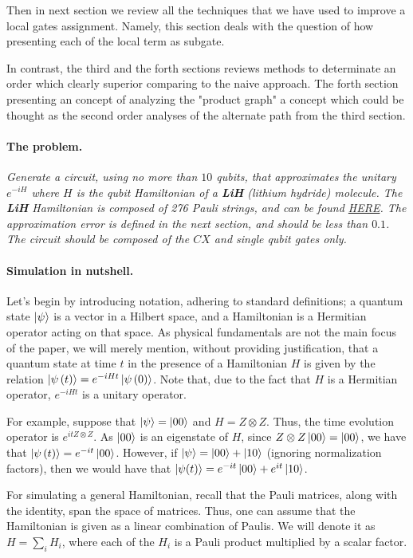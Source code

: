 \documentclass{article}
\begin{document}
\begin{multicols}{2}
Then in next section we review all the techniques that we have used to improve a  local gates assignment. Namely, this section deals with the question of how presenting each of the local term as subgate. 

  In contrast, the third and the forth sections reviews methods to determinate an  order which clearly superior comparing to the naive approach. The forth section presenting an concept of analyzing the "product graph" a concept which could be thought as the second order analyses of the alternate path from the third section.      
  \paragraph{The problem.} \textit{Generate a circuit, using no more than \(10\) qubits, that approximates the unitary \(e^{-iH}\) where \(H\) is the qubit Hamiltonian of a \textbf{LiH} (lithium hydride) molecule. The \textbf{LiH} Hamiltonian is composed of 276 Pauli strings, and can be found \hyperlink{LiH.html.pdf.1}{HERE}. The approximation error is defined in the next section, and should be less than \(0.1\). The circuit should be composed of the \(CX\) and single qubit gates only.}
  \paragraph{Simulation in nutshell.} Let's begin by introducing notation, adhering to standard definitions; a quantum state $\ket{\psi}$ is a vector in a Hilbert space, and a Hamiltonian is a Hermitian operator acting on that space. As physical fundamentals are not the main focus of the paper, we will merely mention, without providing justification, that a quantum state at time $t$ in the presence of a Hamiltonian $H$ is given by the relation $\ket{\psi\left( t\right)} = e^{-iHt}\ket{\psi\left( 0 \right)}$. Note that, due to the fact that $H$ is a Hermitian operator, $e^{-iHt}$ is a unitary operator.

For example, suppose that $\ket{\psi} = \ket{00}$ and $H = Z\otimes Z $. Thus, the time evolution operator is $e^{itZ\otimes Z}$. As $\ket{00}$ is an eigenstate of $H$, since $Z\otimes Z \ket{00} = \ket{00}$, we have that $\ket{\psi\left( t \right)} = e^{-it}\ket{00}$. However, if $\ket{\psi} = \ket{00} + \ket{10}$ (ignoring normalization factors), then we would have that $\ket{\psi(t)} = e^{-it}\ket{00} + e^{it}\ket{10}$.

For simulating a general Hamiltonian, recall that the Pauli matrices, along with the identity, span the space of matrices. Thus, one can assume that the Hamiltonian is given as a linear combination of Paulis. We will denote it as $H = \sum_{i}{H_{i}}$, where each of the $H_{i}$ is a Pauli product multiplied by a scalar factor.


\end{multicols}
\end{document}
